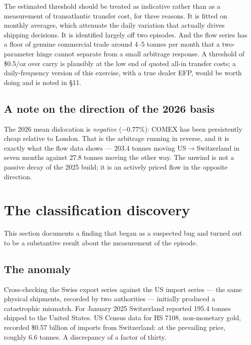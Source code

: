\documentclass[11pt,a4paper]{article}
\begin{document}
The estimated threshold should be treated as indicative rather than as a measurement of
transatlantic transfer cost, for three reasons. It is fitted on monthly averages, which
attenuate the daily variation that actually drives shipping decisions. It is identified largely
off two episodes. And the flow series has a floor of genuine commercial trade around 4--5
tonnes per month that a two-parameter hinge cannot separate from a small arbitrage response.
A threshold of \$0.5/oz over carry is plausibly at the low end of quoted all-in transfer costs;
a daily-frequency version of this exercise, with a true dealer EFP, would be worth doing and is
noted in \S11.

\subsection{A note on the direction of the 2026 basis}

The 2026 mean dislocation is \emph{negative} ($-0.77\%$): COMEX has been persistently cheap
relative to London. That is the arbitrage running in reverse, and it is exactly what the flow
data shows --- 203.4 tonnes moving US$\to$Switzerland in seven months against 27.8 tonnes
moving the other way. The unwind is not a passive decay of the 2025 build; it is an actively
priced flow in the opposite direction.

\section{The classification discovery}
\label{sec:classification}

This section documents a finding that began as a suspected bug and turned out to be a
substantive result about the measurement of the episode.

\subsection{The anomaly}

Cross-checking the Swiss export series against the US import series --- the same physical
shipments, recorded by two authorities --- initially produced a catastrophic mismatch. For
January 2025 Switzerland reported 195.4 tonnes shipped to the United States. US Census data
for HS 7108, non-monetary gold, recorded \$0.57 billion of imports from Switzerland: at the
prevailing price, roughly 6.6 tonnes. A discrepancy of a factor of thirty.
\end{document}

